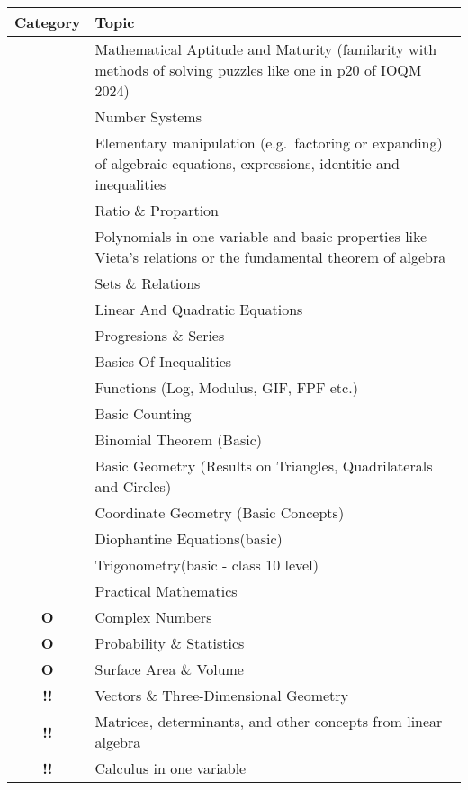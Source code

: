 \documentclass[11pt]{scrartcl}
\providecommand{\isRq}{{\color{green!60!black}\CheckmarkBold}}
\providecommand{\isUs}{{\color{cyan}\sffamily\bfseries O}}
\providecommand{\isAv}{{\color{gray}\sffamily\bfseries !!}}
\begin{document}
\begin{center}
  \begin{tabular}{cp{12cm}}
  \toprule Category & Topic \\ \midrule
  \isRq & Mathematical Aptitude and Maturity (familarity with methods of solving puzzles like one in p20 of IOQM 2024)\\
  \isRq & Number Systems\\
  \isRq & Elementary manipulation (e.g.\ factoring or expanding)
    of algebraic equations, expressions, identitie and inequalities \\
  \isRq & Ratio \& Propartion \\
  \isRq & Polynomials in one variable and basic properties
    like Vieta's relations or the fundamental theorem of algebra \\
  \isRq & Sets \& Relations\\
  \isRq & Linear And Quadratic Equations \\
  \isRq & Progresions \& Series \\
  \isRq & Basics Of Inequalities\\
  \isRq & Functions (Log, Modulus, GIF, FPF etc.)\\
  \isRq & Basic Counting\\
  \isRq & Binomial Theorem (Basic)\\
  \isRq & Basic Geometry (Results on Triangles, Quadrilaterals and Circles)\\
  \isRq & Coordinate Geometry (Basic Concepts)\\
  \isRq & Diophantine Equations(basic)\\
  \isRq & Trigonometry(basic - class 10 level)\\
  \isRq & Practical Mathematics\\
  \isUs & Complex Numbers\\
  \isUs & Probability \& Statistics\\
  \isUs & Surface Area \& Volume\\
  \isAv & Vectors \& Three-Dimensional Geometry\\
  \isAv & Matrices, determinants, and other concepts from linear algebra \\
  \isAv & Calculus in one variable \\
  

\end{tabular}
\end{center}
\end{document}

